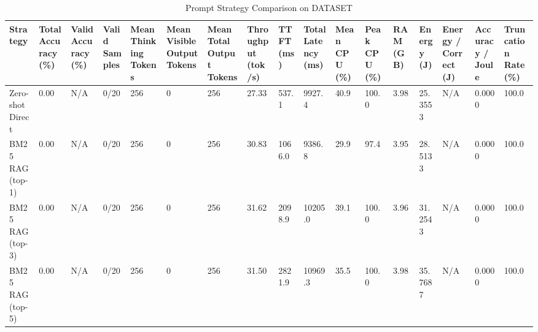 \begin{table}
\caption{Prompt Strategy Comparison on DATASET}
\label{tab:strategy_comparison}
\begin{tabular}{lllllllllllllllll}
\toprule
Strategy & Total Accuracy (\%) & Valid Accuracy (\%) & Valid Samples & Mean Thinking Tokens & Mean Visible Output Tokens & Mean Total Output Tokens & Throughput (tok/s) & TTFT (ms) & Total Latency (ms) & Mean CPU (\%) & Peak CPU (\%) & RAM (GB) & Energy (J) & Energy / Correct (J) & Accuracy / Joule & Truncation Rate (\%) \\
\midrule
Zero-shot Direct & 0.00 & N/A & 0/20 & 256 & 0 & 256 & 27.33 & 537.1 & 9927.4 & 40.9 & 100.0 & 3.98 & 25.3553 & N/A & 0.0000 & 100.0 \\
BM25 RAG (top-1) & 0.00 & N/A & 0/20 & 256 & 0 & 256 & 30.83 & 1066.0 & 9386.8 & 29.9 & 97.4 & 3.95 & 28.5133 & N/A & 0.0000 & 100.0 \\
BM25 RAG (top-3) & 0.00 & N/A & 0/20 & 256 & 0 & 256 & 31.62 & 2098.9 & 10205.0 & 39.1 & 100.0 & 3.96 & 31.2543 & N/A & 0.0000 & 100.0 \\
BM25 RAG (top-5) & 0.00 & N/A & 0/20 & 256 & 0 & 256 & 31.50 & 2821.9 & 10969.3 & 35.5 & 100.0 & 3.98 & 35.7687 & N/A & 0.0000 & 100.0 \\
\bottomrule
\end{tabular}
\end{table}
